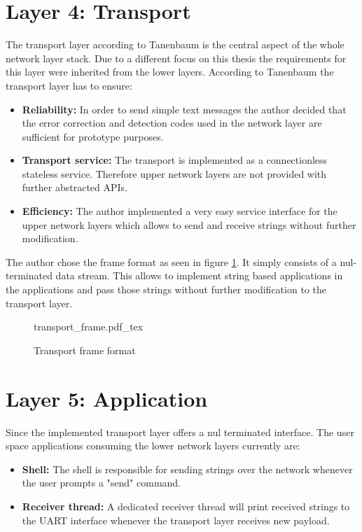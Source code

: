 \section{Layer 4: Transport}%
The transport layer according to Tanenbaum \cite{tannenbaum} is the central aspect of the whole network layer stack. Due to a different focus on this thesis the requirements for this layer were inherited from the lower layers. According to Tanenbaum the transport layer has to ensure:

\begin{itemize}
    \item \textbf{Reliability:} In order to send simple text messages the author decided that the error correction and detection codes used in the network layer are sufficient for prototype purposes.
    \item \textbf{Transport service:} The transport is implemented as a connectionless stateless service. Therefore upper network layers are not provided with further abstracted APIs.
    \item \textbf{Efficiency:} The author implemented a very easy service interface for the upper network layers which allows to send and receive strings without further modification.
\end{itemize}

The author chose the frame format as seen in figure \ref{fig:transport_frame}. It simply consists of a nul-terminated data stream. This allows to implement string based applications in the applications and pass those strings without further modification to the transport layer.

\begin{figure}[H]
    \centering
    {transport_frame.pdf_tex}
    \caption{Transport frame format}
    \label{fig:transport_frame}
\end{figure}

\section{Layer 5: Application}%

Since the implemented transport layer offers a nul terminated interface. The user space applications consuming the lower network layers currently are:

\begin{itemize}
    \item \textbf{Shell:} The shell is responsible for sending strings over the network whenever the user prompts a "send" command.
    \item \textbf{Receiver thread:} A dedicated receiver thread will print received strings to the UART interface whenever the transport layer receives new payload.
\end{itemize}


